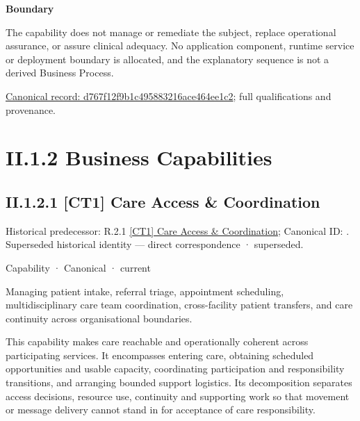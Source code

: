 \textbf{Boundary}



The capability does not manage or remediate the subject, replace operational assurance, or assure clinical adequacy. No application component, runtime service or deployment boundary is allocated, and the explanatory sequence is not a derived Business Process.


{\footnotesize \href{../../../../continuum/strategy/capability/d767f12f9b1c495883216ace464ee1c2.md}{Canonical record: d767f12f9b1c495883216ace464ee1c2}; full qualifications and provenance.}\par
\section*{II.1.2 Business Capabilities}
\label{navigation:II.1.2}

\subsection*{II.1.2.1 [CT1] Care Access \& Coordination}
\label{navigation:II.1.2.1}

{\small Historical predecessor: R.2.1 \hyperref[element:0dec07b6ddbe48bda93a2295dd3e2d7d]{[CT1] Care Access \& Coordination}; Canonical ID: \texttt{}. Superseded historical identity — direct correspondence · superseded.}\par
\label{element:ed342cb8656b4f80b55ad519ecbd2d3a}
{\small Capability · Canonical · current}\par

Managing patient intake, referral triage, appointment scheduling, multidisciplinary care team coordination, cross-facility patient transfers, and care continuity across organisational boundaries.



This capability makes care reachable and operationally coherent across participating services. It encompasses entering care, obtaining scheduled opportunities and usable capacity, coordinating participation and responsibility transitions, and arranging bounded support logistics. Its decomposition separates access decisions, resource use, continuity and supporting work so that movement or message delivery cannot stand in for acceptance of care responsibility.



